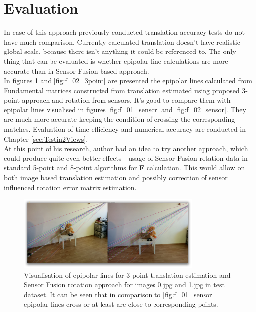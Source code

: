 \section{Evaluation}
In case of this approach previously conducted translation accuracy tests do not have much comparison. Currently calculated translation doesn't have realistic global scale, because there isn't anything it could be referenced to. The only thing that can be evaluated is whether epipolar line calculations are more accurate than in Sensor Fusion based approach. \\
In figures \ref{fig:f_01_3point} and \ref{fig:f_02_3point} are presented the epipolar lines calculated from Fundamental matrices constructed from translation estimated using proposed 3-point approach and rotation from sensors. It's good to compare them with epipolar lines visualised in figures \ref{fig:f_01_sensor} and \ref{fig:f_02_sensor}. They are much more accurate keeping the condition of crossing the corresponding matches. Evaluation of time efficiency and numerical accuracy are conducted in Chapter \ref{sec:Testin2Views}. \\
At this point of his research, author had an idea to try another approach, which could produce quite even better effects - usage of Sensor Fusion rotation data in standard 5-point and 8-point algorithms for \textbf{F} calculation. This would allow on both image based translation estimation and possibly correction of sensor influenced rotation error matrix estimation. 
\begin{figure}[h!]
    \centering
    \includegraphics[width=0.8\textwidth]{f_01_3point}
    \caption[Visualisation of epipolar lines for 3-point translation estimation and Sensor Fusion rotation approach - 1st example]{Visualisation of epipolar lines for 3-point translation estimation and Sensor Fusion rotation approach for images 0.jpg and 1.jpg in test dataset. It can be seen that in comparison to \ref{fig:f_01_sensor} epipolar lines cross or at least are close to corresponding points.}
    \label{fig:f_01_3point}
\end{figure}

